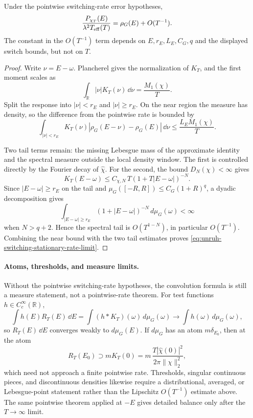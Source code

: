 \begin{proposition}
\label{prop:unruh-switching-rate-error-hypotheses}
Under the pointwise switching-rate error hypotheses,
\begin{equation}
  \frac{P_{\chi_T}(E)}{\lambda^2T_{\rm eff}(T)}
  =
  \rho_G(E)+O(T^{-1}).
  \label{eq:unruh-switching-stationary-rate-limit}
\end{equation}
The constant in the \(O(T^{-1})\) term depends on \(E,r_E,L_E,C_G,q\) and the
displayed switch bounds, but not on \(T\).
\end{proposition}

\begin{proof}
Write \(\nu=E-\omega\).  Plancherel gives the normalization of \(K_T\), and
the first moment scales as
\[
  \int_{\mathbb R}|\nu|K_T(\nu)\,\dd\nu
  =
  \frac{M_1(\chi)}{T}.
\]
Split the response into \(|\nu|<r_E\) and \(|\nu|\ge r_E\).  On the near
region the measure has density, so the difference from the pointwise rate is
bounded by
\[
  \int_{|\nu|<r_E}
  K_T(\nu)|\rho_G(E-\nu)-\rho_G(E)|\,\dd\nu
  \le
  \frac{L_E M_1(\chi)}{T}.
\]

Two tail terms remain: the missing Lebesgue mass of the approximate identity
and the spectral measure outside the local density window.  The first is
controlled directly by the Fourier decay of \(\widehat\chi\).  For the
second, the bound \(D_N(\chi)<\infty\) gives
\[
  K_T(E-\omega)
  \le
  C_{\chi,N}\,T(1+T|E-\omega|)^{-N}.
\]
Since \(|E-\omega|\ge r_E\) on the tail and
\(\mu_G([-R,R])\le C_G(1+R)^q\), a dyadic decomposition gives
\[
  \int_{|E-\omega|\ge r_E}
  (1+|E-\omega|)^{-N}\,d\mu_G(\omega)
  <\infty
\]
when \(N>q+2\).  Hence the spectral tail is \(O(T^{1-N})\), in particular
\(O(T^{-1})\).  Combining the near bound with the two tail estimates proves
\eqref{eq:unruh-switching-stationary-rate-limit}.
\end{proof}

\paragraph{Atoms, thresholds, and measure limits.}
Without the pointwise switching-rate hypotheses, the convolution formula is
still a measure statement, not a pointwise-rate theorem.  For test functions
\(h\in C_c^\infty(\mathbb R)\),
\[
  \int h(E)R_T(E)\,\dd E
  =
  \int (h\ast K_T)(\omega)\,d\mu_G(\omega)
  \longrightarrow
  \int h(\omega)\,d\mu_G(\omega),
\]
so \(R_T(E)\,\dd E\) converges weakly to \(d\mu_G(E)\).  If
\(d\mu_G\) has an atom \(m\delta_{E_0}\), then at the atom
\[
  R_T(E_0)\supset
  m K_T(0)
  =
  m\,\frac{T|\widehat\chi(0)|^2}{2\pi\|\chi\|_2^2},
\]
which need not approach a finite pointwise rate.  Thresholds, singular
continuous pieces, and discontinuous densities likewise require a
distributional, averaged, or Lebesgue-point statement rather than the
Lipschitz \(O(T^{-1})\) estimate above.  The same pointwise theorem applied
at \(-E\) gives detailed balance only after the \(T\to\infty\) limit.

